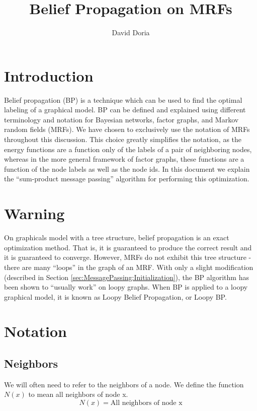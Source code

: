 \documentclass[a4paper,10pt]{article}
\title{Belief Propagation on MRFs}
\author{David Doria}
\begin{document}
\maketitle

\section{Introduction}
\label{sec:Introduction}
Belief propagation (BP) is a technique which can be used to find the optimal labeling of a graphical model. BP can be defined and explained using different terminology and notation for Bayesian networks, factor graphs, and Markov random fields (MRFs). We have chosen to exclusively use the notation of MRFs throughout this discussion. This choice greatly simplifies the notation, as the energy functions are a function only of the labels of a pair of neighboring nodes, whereas in the more general framework of factor graphs, these functions are a function of the node labels as well as the node ids. In this document we explain the ``sum-product message passing'' algorithm for performing this optimization.

\section{Warning}
On graphicals model with a tree structure, belief propagation is an exact optimization method. That is, it is guaranteed to produce the correct result and it is guaranteed to converge. However, MRFs do not exhibit this tree structure - there are many ``loops'' in the graph of an MRF. With only a slight modification (described in Section \ref{sec:MessagePassing:Initialization}), the BP algorithm has been shown to ``usually work'' on loopy graphs. When BP is applied to a loopy graphical model, it is known as Loopy Belief Propagation, or Loopy BP.

\section{Notation}
\subsection{Neighbors}
We will often need to refer to the neighbors of a node. We define the function $N(x)$ to mean all neighbors of node x.
\begin{equation}
N(x) = \mbox{All neighbors of node x}
\end{equation}
\end{document}
